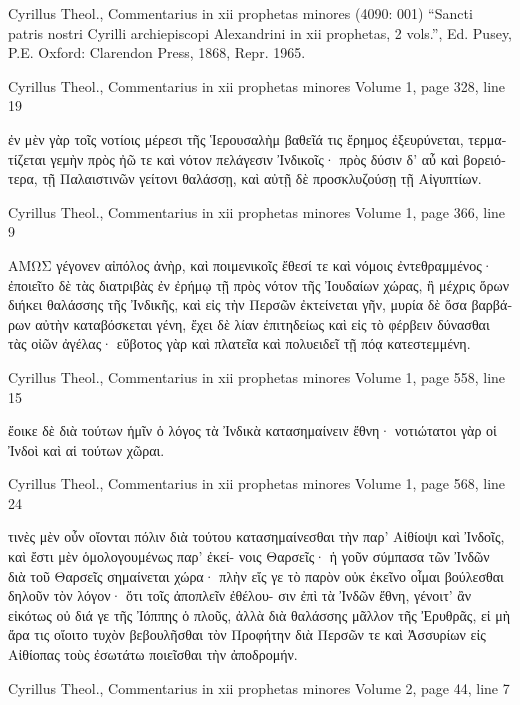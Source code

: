 \documentclass[12pt,letterpaper,twoside,final]{memoir}
\begin{document}
\begin{greek}


Cyrillus Theol., Commentarius in xii prophetas minores (4090: 001)
“Sancti patris nostri Cyrilli archiepiscopi Alexandrini in xii prophetas, 2 vols.”, Ed. Pusey, P.E.
Oxford: Clarendon Press, 1868, Repr. 1965.


Cyrillus Theol., Commentarius in xii prophetas minores 
Volume 1, page 328, line 19

ἐν μὲν γὰρ τοῖς νοτίοις μέρεσι τῆς Ἱερουσαλὴμ βαθεῖά τις 
ἔρημος ἐξευρύνεται, τερματίζεται γεμὴν πρὸς ἠῶ τε καὶ νότον 
πελάγεσιν Ἰνδικοῖς· πρὸς δύσιν δ' αὖ καὶ βορειότερα, τῇ 
Παλαιστινῶν γείτονι θαλάσσῃ, καὶ αὐτῇ δὲ προσκλυζούσῃ 
τῇ Αἰγυπτίων. 



Cyrillus Theol., Commentarius in xii prophetas minores 
Volume 1, page 366, line 9

ΑΜΩΣ γέγονεν αἰπόλος ἀνὴρ, καὶ ποιμενικοῖς ἔθεσί τε 
καὶ νόμοις ἐντεθραμμένος· ἐποιεῖτο δὲ τὰς διατριβὰς ἐν 
ἐρήμῳ τῇ πρὸς νότον τῆς Ἰουδαίων χώρας, ἣ μέχρις ὅρων 
διήκει θαλάσσης τῆς Ἰνδικῆς, καὶ εἰς τὴν Περσῶν ἐκτείνεται 
γῆν, μυρία δὲ ὅσα βαρβάρων αὐτὴν καταβόσκεται γένη, ἔχει 
δὲ λίαν ἐπιτηδείως καὶ εἰς τὸ φέρβειν δύνασθαι τὰς οἰῶν 
ἀγέλας· εὔβοτος γὰρ καὶ πλατεῖα καὶ πολυειδεῖ τῇ πόᾳ 
κατεστεμμένη. 



Cyrillus Theol., Commentarius in xii prophetas minores 
Volume 1, page 558, line 15

                                     ἔοικε δὲ διὰ τούτων ἡμῖν ὁ 
λόγος τὰ Ἰνδικὰ κατασημαίνειν ἔθνη· νοτιώτατοι γὰρ οἱ 
Ἰνδοὶ καὶ αἱ τούτων χῶραι. 



Cyrillus Theol., Commentarius in xii prophetas minores 
Volume 1, page 568, line 24

                                                         τινὲς μὲν 
οὖν οἴονται πόλιν διὰ τούτου κατασημαίνεσθαι τὴν παρ' 
Αἰθίοψι καὶ Ἰνδοῖς, καὶ ἔστι μὲν ὁμολογουμένως παρ' ἐκεί-
νοις Θαρσεῖς· ἡ γοῦν σύμπασα τῶν Ἰνδῶν διὰ τοῦ Θαρσεῖς 
σημαίνεται χώρα· πλὴν εἴς γε τὸ παρὸν οὐκ ἐκεῖνο οἶμαι   
βούλεσθαι δηλοῦν τὸν λόγον· ὅτι τοῖς ἀποπλεῖν ἐθέλου-
σιν ἐπὶ τὰ Ἰνδῶν ἔθνη, γένοιτ' ἂν εἰκότως οὐ διά γε τῆς 
Ἰόππης ὁ πλοῦς, ἀλλὰ διὰ θαλάσσης μᾶλλον τῆς Ἐρυθρᾶς, 
εἰ μὴ ἄρα τις οἴοιτο τυχὸν βεβουλῆσθαι τὸν Προφήτην διὰ 
Περσῶν τε καὶ Ἀσσυρίων εἰς Αἰθίοπας τοὺς ἐσωτάτω 
ποιεῖσθαι τὴν ἀποδρομήν. 



Cyrillus Theol., Commentarius in xii prophetas minores 
Volume 2, page 44, line 7


\end{greek}
\end{document}
